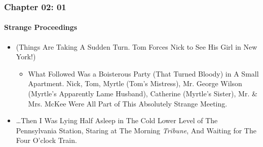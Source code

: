 \begin{frame}
\frametitle{Chapter 02: 01}
\framesubtitle{Strange Proceedings}
\label{slide:chapter-02-01}
\begin{itemize}
\pause \item (Things Are Taking A Sudden Turn. Tom Forces Nick to See \alert{His Girl in New York}!)
\begin{itemize}
\pause \item What Followed Was a Boisterous Party (That Turned Bloody) in A Small Apartment. Nick, Tom, Myrtle (Tom's Mistress), Mr. George Wilson (Myrtle's Apparently Lame Husband), Catherine (Myrtle's Sister), Mr. \& Mrs. McKee Were All Part of This Absolutely Strange Meeting. 
\end{itemize}
\pause\item \dots Then I Was Lying Half Asleep in The Cold Lower Level of The Pennsylvania Station, Staring at The Morning \textit{Tribune}, And Waiting for The Four O'clock Train.
\end{itemize}
\end{frame}
